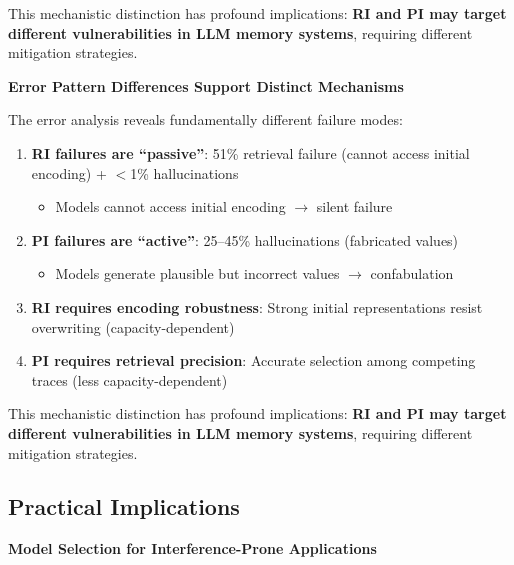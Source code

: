 \documentclass{article}
\begin{document}
This mechanistic distinction has profound implications: \textbf{RI and PI may target different vulnerabilities in LLM memory systems}, requiring different mitigation strategies.

\textbf{Error Pattern Differences Support Distinct Mechanisms}

The error analysis reveals fundamentally different failure modes:
\begin{enumerate}
    \item \textbf{RI failures are ``passive''}: 51\% retrieval failure (cannot access initial encoding) + $<$1\% hallucinations
    \begin{itemize}[itemsep=2pt,topsep=3pt,parsep=0pt]
        \item Models cannot access initial encoding $\rightarrow$ silent failure
    \end{itemize}

    \item \textbf{PI failures are ``active''}: 25--45\% hallucinations (fabricated values)~\citep{liu2024unable}
    \begin{itemize}[itemsep=2pt,topsep=3pt,parsep=0pt]
        \item Models generate plausible but incorrect values $\rightarrow$ confabulation
    \end{itemize}

    \item \textbf{RI requires encoding robustness}: Strong initial representations resist overwriting (capacity-dependent)

    \item \textbf{PI requires retrieval precision}: Accurate selection among competing traces (less capacity-dependent)
\end{enumerate}

This mechanistic distinction has profound implications: \textbf{RI and PI may target different vulnerabilities in LLM memory systems}, requiring different mitigation strategies.

\subsection{Practical Implications}

\textbf{Model Selection for Interference-Prone Applications}
\end{document}
